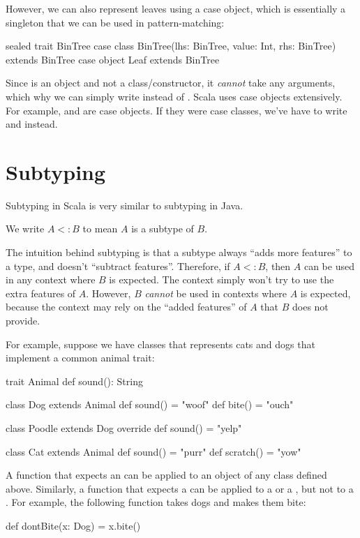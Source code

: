 \documentclass{book}
\begin{document}
However, we can also represent leaves using a case object, which is essentially
a singleton that we can be used in pattern-matching:
%
\begin{scalacode}
sealed trait BinTree
case class BinTree(lhs: BinTree, value: Int, rhs: BinTree) extends BinTree
case object Leaf extends BinTree
\end{scalacode}

Since  is an object and not a class/constructor, it \emph{cannot}
take any arguments, which why we can simply write  instead
of . Scala uses case objects extensively. For example,
 and  are case objects. If they
were case classes, we've have to write  and
 instead.

\section{Subtyping}

Subtyping in Scala is very similar to subtyping in Java.

\begin{notation}
We write $A <: B$ to mean $A$ is a subtype of $B$.
\end{notation}

The intuition behind subtyping is that a subtype always ``adds more features''
to a type, and doesn't ``subtract features''. Therefore, if $A <: B$,
then $A$ can be used in any context where $B$ is expected. The context simply
won't try to use the extra features of $A$. However, $B$ \emph{cannot}
be used in contexts where $A$ is expected, because the context may rely on
the ``added features'' of $A$ that $B$ does not provide.

For example, suppose we have classes that represents cats and dogs that
implement a common animal trait:
%
\begin{scalacode}
trait Animal {
  def sound(): String
}

class Dog extends Animal {
  def sound() = "woof"
  def bite() = "ouch"
}

class Poodle extends Dog {
  override def sound() = "yelp"
}

class Cat extends Animal {
  def sound() = "purr"
  def scratch() = "yow"
}
\end{scalacode}

A function that expects an  can be applied to an object
of any class defined above. Similarly, a function that expects a 
can be applied to a  or a , but not to a
. For example, the following function takes dogs and makes
them bite:
\begin{scalacode}
def dontBite(x: Dog) = {
  x.bite()
}
\end{scalacode}
\end{document}
